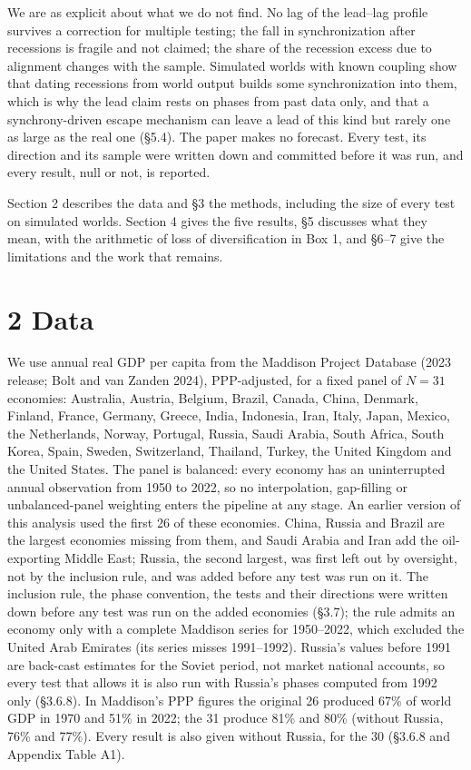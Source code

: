 \documentclass[11pt,a4paper]{article}
\begin{document}
We are as explicit about what we do not find. No lag of the lead–lag profile survives a correction for multiple testing; the fall in synchronization after recessions is fragile and not claimed; the share of the recession excess due to alignment changes with the sample. Simulated worlds with known coupling show that dating recessions from world output builds some synchronization into them, which is why the lead claim rests on phases from past data only, and that a synchrony-driven escape mechanism can leave a lead of this kind but rarely one as large as the real one (§5.4). The paper makes no forecast. Every test, its direction and its sample were written down and committed before it was run, and every result, null or not, is reported.

Section 2 describes the data and §3 the methods, including the size of every test on simulated worlds. Section 4 gives the five results, §5 discusses what they mean, with the arithmetic of loss of diversification in Box 1, and §6–7 give the limitations and the work that remains.

\section{2 Data}\label{data}

We use annual real GDP per capita from the Maddison Project Database (2023 release; Bolt and van Zanden 2024), PPP-adjusted, for a fixed panel of \(N = 31\) economies: Australia, Austria, Belgium, Brazil, Canada, China, Denmark, Finland, France, Germany, Greece, India, Indonesia, Iran, Italy, Japan, Mexico, the Netherlands, Norway, Portugal, Russia, Saudi Arabia, South Africa, South Korea, Spain, Sweden, Switzerland, Thailand, Turkey, the United Kingdom and the United States. The panel is balanced: every economy has an uninterrupted annual observation from 1950 to 2022, so no interpolation, gap-filling or unbalanced-panel weighting enters the pipeline at any stage. An earlier version of this analysis used the first 26 of these economies. China, Russia and Brazil are the largest economies missing from them, and Saudi Arabia and Iran add the oil-exporting Middle East; Russia, the second largest, was first left out by oversight, not by the inclusion rule, and was added before any test was run on it. The inclusion rule, the phase convention, the tests and their directions were written down before any test was run on the added economies (§3.7); the rule admits an economy only with a complete Maddison series for 1950–2022, which excluded the United Arab Emirates (its series misses 1991–1992). Russia's values before 1991 are back-cast estimates for the Soviet period, not market national accounts, so every test that allows it is also run with Russia's phases computed from 1992 only (§3.6.8). In Maddison's PPP figures the original 26 produced 67\% of world GDP in 1970 and 51\% in 2022; the 31 produce 81\% and 80\% (without Russia, 76\% and 77\%). Every result is also given without Russia, for the 30 (§3.6.8 and Appendix Table A1).
\end{document}

